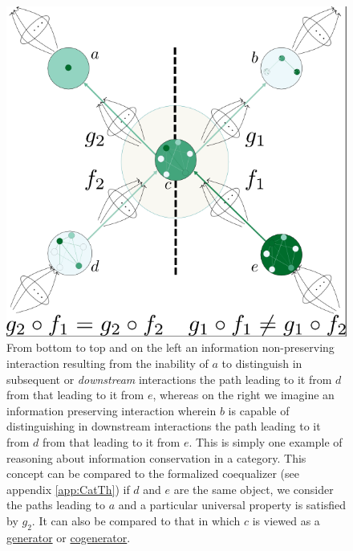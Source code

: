 \documentclass[aps,twocolumn]{revtex4-1}
\begin{document}
\begin{figure}
\noindent\includegraphics[width=0.9\columnwidth]{fig/infopres.png}
\caption{From bottom to top and on the left an information non-preserving interaction resulting from the inability of $a$ to distinguish in subsequent or {\it downstream} interactions the path leading to it from $d$ from that leading to it from $e$, whereas on the right we imagine an information preserving interaction wherein $b$ is capable of distinguishing in downstream interactions the path leading to it from $d$ from that leading to it from $e$. This is simply one example of reasoning about information conservation in a category. This concept can be compared to the formalized coequalizer (see appendix \ref{app:CatTh}) if $d$ and $e$ are the same object, we consider the paths leading to $a$ and a particular universal property is satisfied by $g_2$. It can also be compared to that in which $c$ is viewed as a \href{http://en.wikipedia.org/wiki/Generator_(category_theory)}{generator} or \href{http://en.wikipedia.org/wiki/Injective_cogenerator}{cogenerator}.}
\label{fig:infopres}
\end{figure}

\end{document}
